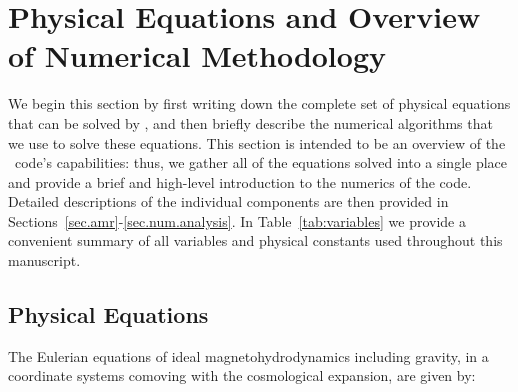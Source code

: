 

\section{Physical Equations and Overview of Numerical Methodology}
\label{sec.overview}

We begin this section by first writing down the complete set of
physical equations that can be solved by \enzo, and then briefly
describe the numerical algorithms that we use to solve these
equations.  This section is intended to be an overview of the
\enzo\ code's capabilities: thus, we gather all of the equations
solved into a single place and provide a brief and high-level
introduction to the numerics of the code.  Detailed descriptions of
the individual components are then provided in
Sections~\ref{sec.amr}-\ref{sec.num.analysis}. In
Table~\ref{tab:variables} we provide a convenient summary of all
variables and physical constants used throughout this manuscript.




\subsection{Physical Equations}
\label{sec.equations}



The Eulerian equations of ideal magnetohydrodynamics including
gravity, in a coordinate systems comoving with the cosmological
expansion, are given by:


